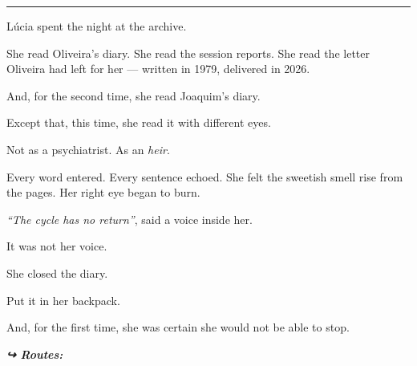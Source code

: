 \vspace{0.5em}\noindent\rule{\textwidth}{0.5pt}\vspace{0.5em}

\noindent Lúcia spent the night at the archive.

\noindent She read Oliveira's diary. She read the session reports. She read the letter Oliveira had left for her --- written in 1979, delivered in 2026.

\noindent And, for the second time, she read Joaquim's diary.

\noindent Except that, this time, she read it with different eyes.

\noindent Not as a psychiatrist.
As an \textit{heir}.

\noindent Every word entered. Every sentence echoed. She felt the sweetish smell rise from the pages. Her right eye began to burn.

\noindent \textit{\textquotedblleft{}The cycle has no return\textquotedblright{}}, said a voice inside her.

\noindent It was not her voice.

\noindent She closed the diary.

\noindent Put it in her backpack.

\noindent And, for the first time, she was certain she would not be able to stop.

\vspace{0.5em}
\noindent\textit{\textbf{↪ Routes:}  \rotasep {}}

